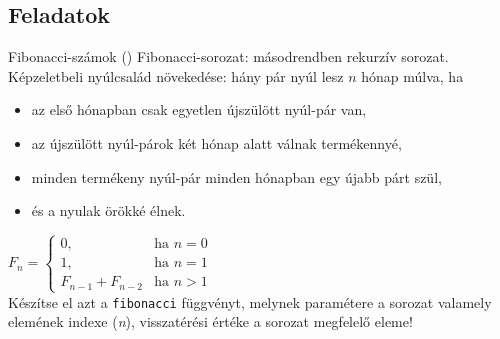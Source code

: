 \subsection{Feladatok}

\begin{frame}
    \begin{exampleblock}{Fibonacci-számok ()}
        Fibonacci-sorozat: másodrendben rekurzív sorozat. Képzeletbeli nyúlcsalád növekedése: hány pár nyúl lesz $n$ hónap múlva, ha
        \begin{itemize}
            \item az első hónapban csak egyetlen újszülött nyúl-pár van,
            \item az újszülött nyúl-párok két hónap alatt válnak termékennyé,
            \item minden termékeny nyúl-pár minden hónapban egy újabb párt szül,
            \item és a nyulak örökké élnek.
        \end{itemize}
        \vfill
        $F_n = \left\{ \begin{array}{ll}
            0, & \textrm{ha $n=0$}\\
            1, & \textrm{ha $n=1$}\\
            F_{n-1} + F_{n-2} & \textrm{ha $n>1$}
        \end{array} \right.$ \\
        Készítse el azt a \texttt{fibonacci} függvényt, melynek paramétere a sorozat valamely elemének indexe (\emph{n}), visszatérési értéke a sorozat megfelelő eleme!
    \end{exampleblock}
\end{frame}

